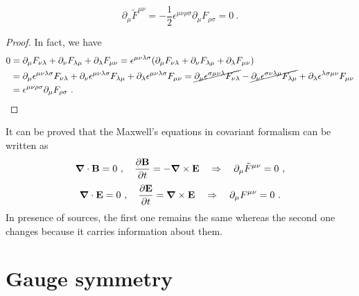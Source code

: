     \begin{equation*}
        \partial_\mu \tilde F^{\mu\nu} = - \frac{1}{2} \epsilon^{\mu\nu\rho\sigma} \partial_\mu  F_{\rho\sigma} = 0 ~.
    \end{equation*}
    \begin{proof}
        In fact, we have
        \begin{equation*}
        \begin{aligned}
            0 & = \partial_\mu F_{\nu\lambda} + \partial_\nu F_{\lambda \mu} + \partial_\lambda F_{\mu \nu} = \epsilon^{\mu\nu\lambda\sigma} (\partial_\mu F_{\nu\lambda} + \partial_\nu F_{\lambda \mu} + \partial_\lambda F_{\mu \nu}) \\ & = \partial_\mu \epsilon^{\mu\nu\lambda\sigma} F_{\nu\lambda} + \partial_\nu \epsilon^{\mu\nu\lambda\sigma} F_{\lambda \mu} + \partial_\lambda \epsilon^{\mu\nu\lambda\sigma} F_{\mu \nu} = \cancel{\partial_\mu \epsilon^{\sigma\mu\nu\lambda} F_{\nu\lambda}} - \cancel{\partial_\nu \epsilon^{\sigma\nu\lambda\mu} F_{\lambda\mu}} + \partial_\lambda \epsilon^{\lambda\sigma\mu\nu} F_{\mu \nu} \\ & = \epsilon^{\mu\nu\rho\sigma} \partial_\mu  F_{\rho\sigma} ~.
        \end{aligned}
        \end{equation*}
    \end{proof}

    It can be proved that the Maxwell's equations in covariant formalism can be written as 
    \begin{equation*}
        \boldsymbol \nabla \cdot \mathbf B = 0 ~, \quad \frac{\partial\mathbf B}{\partial t} = - \boldsymbol \nabla \times \mathbf E \quad \Rightarrow \quad \partial_\mu \tilde F^{\mu\nu} = 0 ~,
    \end{equation*}
    \begin{equation*}
        \boldsymbol \nabla \cdot \mathbf E = 0 ~, \quad \frac{\partial\mathbf E}{\partial t} = \boldsymbol \nabla \times \mathbf E \quad \Rightarrow \quad \partial_\mu F^{\mu\nu} = 0 ~.
    \end{equation*}
    In presence of sources, the first one remains the same whereas the second one changes because it carries information about them. 

\section{Gauge symmetry}

